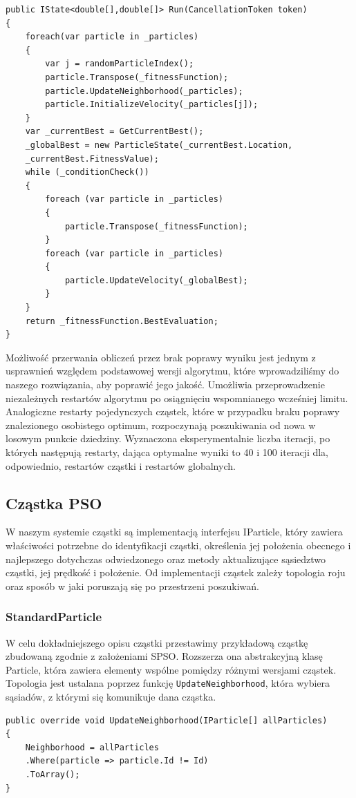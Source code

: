 \documentclass[12pt, twoside, openany, abstract=on]{report}
\theoremstyle{definition}
\begin{document}
\lstset{style=sharpc}
\begin{lstlisting}[frame=single]
public IState<double[],double[]> Run(CancellationToken token)
{
	foreach(var particle in _particles)
	{
		var j = randomParticleIndex();	      
		particle.Transpose(_fitnessFunction);
	    particle.UpdateNeighborhood(_particles);
		particle.InitializeVelocity(_particles[j]);
	}
	var _currentBest = GetCurrentBest();
	_globalBest = new ParticleState(_currentBest.Location,
	_currentBest.FitnessValue);
	while (_conditionCheck())
	{
		foreach (var particle in _particles)
		{
	    	particle.Transpose(_fitnessFunction);
	    }
		foreach (var particle in _particles)
	    {
			particle.UpdateVelocity(_globalBest);
		}
	}
	return _fitnessFunction.BestEvaluation;
}
\end{lstlisting}

Możliwość przerwania obliczeń przez brak poprawy wyniku jest jednym z usprawnień względem podstawowej wersji algorytmu, które wprowadziliśmy do naszego rozwiązania, aby poprawić jego jakość. Umożliwia przeprowadzenie niezależnych restartów algorytmu po osiągnięciu wspomnianego wcześniej limitu. Analogiczne restarty pojedynczych cząstek, które w przypadku braku poprawy znalezionego osobistego optimum, rozpoczynają poszukiwania od nowa w losowym punkcie dziedziny. Wyznaczona eksperymentalnie liczba iteracji, po których następują restarty, dająca optymalne wyniki to 40 i 100 iteracji dla, odpowiednio, restartów cząstki i restartów globalnych.

\subsection{Cząstka PSO}
W naszym systemie cząstki są implementacją interfejsu IParticle, który zawiera właściwości potrzebne do identyfikacji cząstki, określenia jej położenia obecnego i najlepszego dotychczas odwiedzonego oraz metody   aktualizujące sąsiedztwo cząstki, jej prędkość i położenie. Od implementacji cząstek zależy topologia roju oraz sposób w jaki poruszają się po przestrzeni poszukiwań. 

\subsubsection{StandardParticle}
W celu dokładniejszego opisu cząstki przestawimy przykładową cząstkę zbudowaną zgodnie z założeniami SPSO. %
Rozszerza ona abstrakcyjną klasę Particle, która zawiera elementy wspólne pomiędzy różnymi wersjami cząstek. Topologia jest ustalana poprzez funkcję \texttt{UpdateNeighborhood}, która wybiera sąsiadów, z którymi się komunikuje dana cząstka.
\lstset{style=sharpc}
\begin{lstlisting}[frame=single]
public override void UpdateNeighborhood(IParticle[] allParticles)
{
	Neighborhood = allParticles
	.Where(particle => particle.Id != Id)
	.ToArray();
}
\end{lstlisting}
\end{document}
